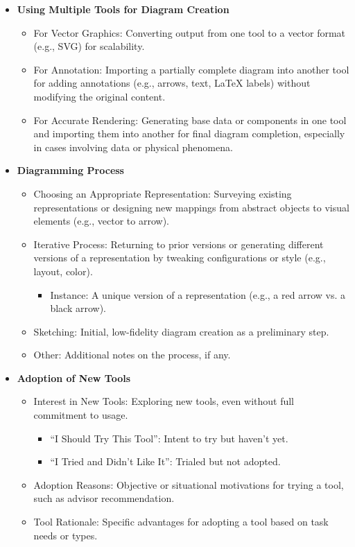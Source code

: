 \begin{itemize}
    \item \textbf{Using Multiple Tools for Diagram Creation}
    \begin{itemize}
        \item For Vector Graphics: Converting output from one tool to a vector format (e.g., SVG) for scalability.
        \item For Annotation: Importing a partially complete diagram into another tool for adding annotations (e.g., arrows, text, LaTeX labels) without modifying the original content.
        \item For Accurate Rendering: Generating base data or components in one tool and importing them into another for final diagram completion, especially in cases involving data or physical phenomena.
    \end{itemize}

    \item \textbf{Diagramming Process}
    \begin{itemize}
        \item Choosing an Appropriate Representation: Surveying existing representations or designing new mappings from abstract objects to visual elements (e.g., vector to arrow).
        \item Iterative Process: Returning to prior versions or generating different versions of a representation by tweaking configurations or style (e.g., layout, color).
        \begin{itemize}
            \item Instance: A unique version of a representation (e.g., a red arrow vs. a black arrow).
        \end{itemize}
        \item Sketching: Initial, low-fidelity diagram creation as a preliminary step.
        \item Other: Additional notes on the process, if any.
    \end{itemize}

    \item \textbf{Adoption of New Tools}
    \begin{itemize}
        \item Interest in New Tools: Exploring new tools, even without full commitment to usage.
        \begin{itemize}
            \item ``I Should Try This Tool'': Intent to try but haven’t yet.
            \item ``I Tried and Didn’t Like It'': Trialed but not adopted.
        \end{itemize}
        \item Adoption Reasons: Objective or situational motivations for trying a tool, such as advisor recommendation.
        \item Tool Rationale: Specific advantages for adopting a tool based on task needs or types.
    \end{itemize}


\end{itemize}
